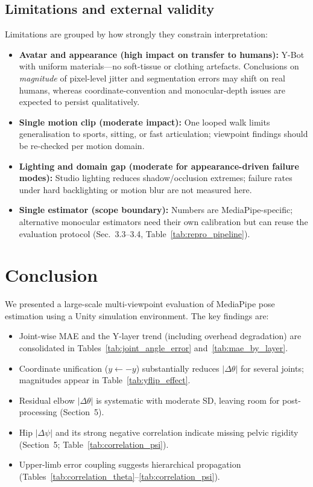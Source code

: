 \documentclass[twocolumn]{article}
\begin{document}
\subsection{Limitations and external validity}

Limitations are grouped by how strongly they constrain interpretation:
\begin{itemize}\itemsep2pt
  \item \textbf{Avatar and appearance (high impact on transfer to humans):}
        Y-Bot with uniform materials---no soft-tissue or clothing
        artefacts. Conclusions on \emph{magnitude} of pixel-level jitter
        and segmentation errors may shift on real humans, whereas
        coordinate-convention and monocular-depth issues are expected to
        persist qualitatively.
  \item \textbf{Single motion clip (moderate impact):}
        One looped walk limits generalisation to sports, sitting, or
        fast articulation; viewpoint findings should be re-checked per
        motion domain.
  \item \textbf{Lighting and domain gap (moderate for appearance-driven
        failure modes):}
        Studio lighting reduces shadow/occlusion extremes; failure rates
        under hard backlighting or motion blur are not measured here.
  \item \textbf{Single estimator (scope boundary):}
        Numbers are MediaPipe-specific; alternative monocular estimators
        need their own calibration but can reuse the evaluation protocol
        (Sec.~3.3--3.4, Table~\ref{tab:repro_pipeline}).
\end{itemize}

\section{Conclusion}

We presented a large-scale multi-viewpoint evaluation of MediaPipe pose
estimation using a Unity simulation environment. The key findings are:
\begin{itemize}\itemsep2pt
  \item Joint-wise MAE and the Y-layer trend (including overhead degradation)
        are consolidated in Tables~\ref{tab:joint_angle_error}
        and~\ref{tab:mae_by_layer}.
  \item Coordinate unification ($y \leftarrow -y$) substantially reduces
        $|\Delta\theta|$ for several joints; magnitudes appear in
        Table~\ref{tab:yflip_effect}.
  \item Residual elbow $|\Delta\theta|$ is systematic with moderate SD,
        leaving room for post-processing (Section~5).
  \item Hip $|\Delta\psi|$ and its strong negative correlation indicate
        missing pelvic rigidity (Section~5; Table~\ref{tab:correlation_psi}).
  \item Upper-limb error coupling suggests hierarchical propagation
        (Tables~\ref{tab:correlation_theta}--\ref{tab:correlation_psi}).
\end{itemize}
\end{document}
